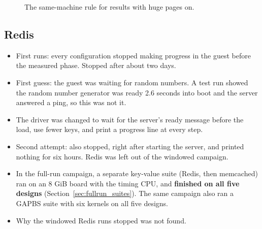 \begin{figure}[H]
\centering
{}
\caption{The same-machine rule for results with huge pages on.}
\label{fig:chr_samehost}
\end{figure}

\subsection{Redis}
\begin{itemize}
    \item First runs: every configuration stopped making progress in the guest before the measured phase. Stopped after about two days.
    \item First guess: the guest was waiting for random numbers. A test run showed the random number generator was ready 2.6 seconds into boot and the server answered a ping, so this was not it.
    \item The driver was changed to wait for the server's ready message before the load, use fewer keys, and print a progress line at every step.
    \item Second attempt: also stopped, right after starting the server, and printed nothing for six hours. Redis was left out of the windowed campaign.
    \item In the full-run campaign, a separate key-value suite (Redis, then memcached) ran on an 8 GiB board with the timing CPU, and \textbf{finished on all five designs} (Section~\ref{sec:fullrun_suites}). The same campaign also ran a GAPBS suite with six kernels on all five designs.
    \item Why the windowed Redis runs stopped was not found.
\end{itemize}

